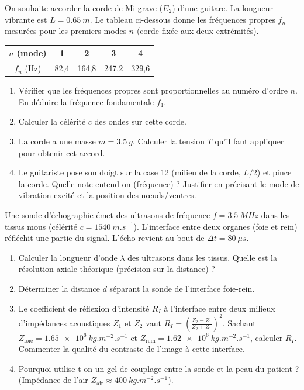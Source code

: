\documentclass[11pt]{article}
\begin{document}
\begin{exercice}
On souhaite accorder la corde de Mi grave ($E_2$) d'une guitare. La longueur vibrante est $L = \SI{0,65}{m}$. Le tableau ci-dessous donne les fréquences propres $f_n$ mesurées pour les premiers modes $n$ (corde fixée aux deux extrémités).

\begin{center}
\begin{tabular}{|c|c|c|c|c|}
\hline
$n$ (mode) & 1 & 2 & 3 & 4 \\
\hline
$f_n$ (Hz) & 82,4 & 164,8 & 247,2 & 329,6 \\
\hline
\end{tabular}
\end{center}
\begin{enumerate}
    \item Vérifier que les fréquences propres sont proportionnelles au numéro d'ordre $n$. En déduire la fréquence fondamentale $f_1$.
    \item Calculer la célérité $c$ des ondes sur cette corde.
    \item La corde a une masse $m = \SI{3,5}{g}$. Calculer la tension $T$ qu'il faut appliquer pour obtenir cet accord.
    \item Le guitariste pose son doigt sur la case 12 (milieu de la corde, $L/2$) et pince la corde. Quelle note entend-on (fréquence) ? Justifier en précisant le mode de vibration excité et la position des nœuds/ventres.
\end{enumerate}
\end{exercice}

\begin{exercice}
Une sonde d'échographie émet des ultrasons de fréquence $f = \SI{3,5}{MHz}$ dans les tissus mous (célérité $c = \SI{1540}{m.s^{-1}}$). L'interface entre deux organes (foie et rein) réfléchit une partie du signal. L'écho revient au bout de $\Delta t = \SI{80}{\mu s}$.
\begin{enumerate}
    \item Calculer la longueur d'onde $\lambda$ des ultrasons dans les tissus. Quelle est la résolution axiale théorique (précision sur la distance) ?
    \item Déterminer la distance $d$ séparant la sonde de l'interface foie-rein.
    \item Le coefficient de réflexion d'intensité $R_I$ à l'interface entre deux milieux d'impédances acoustiques $Z_1$ et $Z_2$ vaut $R_I = \left(\frac{Z_2-Z_1}{Z_2+Z_1}\right)^2$. Sachant $Z_{\text{foie}} = \SI{1,65e6}{kg.m^{-2}.s^{-1}}$ et $Z_{\text{rein}} = \SI{1,62e6}{kg.m^{-2}.s^{-1}}$, calculer $R_I$. Commenter la qualité du contraste de l'image à cette interface.
    \item Pourquoi utilise-t-on un gel de couplage entre la sonde et la peau du patient ? (Impédance de l'air $Z_{\text{air}} \approx \SI{400}{kg.m^{-2}.s^{-1}}$).
\end{enumerate}
\end{exercice}
\end{document}
